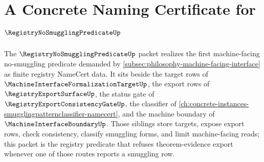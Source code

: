 \chapter{A Concrete Naming Certificate for $\RegistryNoSmugglingPredicateUp$}
\label{ch:concrete-instances-registrynosmugglingpredicate-namecert}

The $\RegistryNoSmugglingPredicateUp$ packet realizes the first machine-facing no-smuggling predicate demanded by \autoref{subsec:philosophy-machine-facing-interface} as finite registry NameCert data. It sits beside the target rows of $\MachineInterfaceFormalizationTargetUp$, the export rows of $\RegistryExportSurfaceUp$, the status gate of $\RegistryExportConsistencyGateUp$, the classifier of \autoref{ch:concrete-instances-smugglingpatternclassifier-namecert}, and the machine boundary of $\MachineInterfaceBoundaryUp$. Those siblings store targets, expose export rows, check consistency, classify smuggling forms, and limit machine-facing reads; this packet is the registry predicate that refuses theorem-evidence export whenever one of those routes reports a smuggling row.


